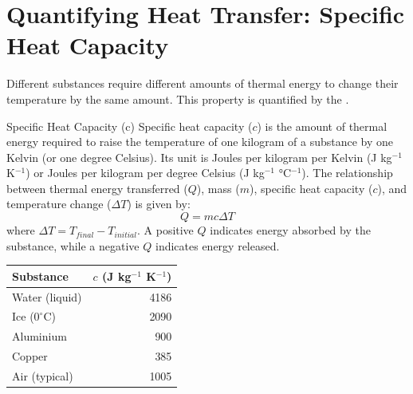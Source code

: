 \FloatBarrier

\section{Quantifying Heat Transfer: Specific Heat Capacity}
\label{sec:specific_heat}
\FloatBarrier

Different substances require different amounts of thermal energy to change their temperature by the same amount. This property is quantified by the .

\begin{keyconcept}{Specific Heat Capacity (c)}
Specific heat capacity (\(c\)) is the amount of thermal energy required to raise the temperature of one kilogram of a substance by one Kelvin (or one degree Celsius). Its unit is Joules per kilogram per Kelvin (J kg\(^{-1}\) K\(^{-1}\)) or Joules per kilogram per degree Celsius (J kg\(^{-1}\) °C\(^{-1}\)). The relationship between thermal energy transferred (\(Q\)), mass (\(m\)), specific heat capacity (\(c\)), and temperature change (\(\Delta T\)) is given by:
\begin{equation}
Q = mc\Delta T
\label{eq:specific_heat}
\end{equation}
where \(\Delta T = T_{final} - T_{initial}\). A positive \(Q\) indicates energy absorbed by the substance, while a negative \(Q\) indicates energy released.
\end{keyconcept}



\begin{marginfigure}[-10pt]
\centering
\small %
\begin{tabular}{lr}
\toprule
Substance & \(c\) (J kg\(^{-1}\) K\(^{-1}\)) \\
\midrule
Water (liquid) & 4186 \\
Ice (\(0^\circ\)C) & 2090 \\
Aluminium & 900 \\
Copper & 385 \\
Air (typical) & 1005 \\
\bottomrule
\end{tabular}
\caption{Approximate specific heat capacities of common substances. Note water's high value.}
\label{tab:specific_heat}
\end{marginfigure}

